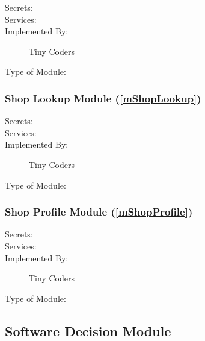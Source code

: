 \documentclass[12pt, titlepage]{article}
\begin{document}
\begin{description}
	\item[Secrets:]
	\item[Services:]
	\item[Implemented By:] Tiny Coders
	\item[Type of Module:]
\end{description}

\subsubsection{Shop Lookup Module (\ref{mShopLookup})}

\begin{description}
	\item[Secrets:]
	\item[Services:]
	\item[Implemented By:] Tiny Coders
	\item[Type of Module:]
\end{description}

\subsubsection{Shop Profile Module (\ref{mShopProfile})}

\begin{description}
	\item[Secrets:]
	\item[Services:]
	\item[Implemented By:] Tiny Coders
	\item[Type of Module:]
\end{description}

\subsection{Software Decision Module}

\end{document}
